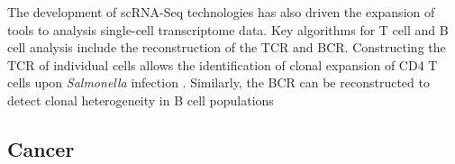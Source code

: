 The development of scRNA-Seq technologies has also driven the expansion of tools to analysis single-cell transcriptome data. Key algorithms for T cell and B cell analysis include the reconstruction of the TCR and \gls{BCR}. Constructing the TCR of individual cells allows the identification of clonal expansion of CD4\plus{} T cells upon \textit{Salmonella} infection \citep{Stubbington2016}. Similarly, the BCR can be reconstructed to detect clonal heterogeneity in B cell populations \citep{Canzar2017, Wu2018}

\subsection{Cancer}

